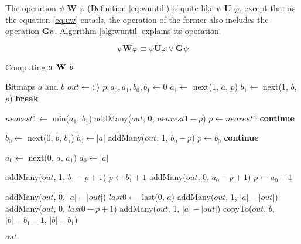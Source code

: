 The operation $\psi \textbf{ W } \varphi$ (Definition \eqref{eq:wuntil}) is quite like $\psi \textbf{ U } \varphi$, except that as the equation \eqref{eq:uw} \citep{huth2004} entails, the operation of the former also includes the operation $\textbf{G}\psi$. Algorithm \ref{alg:wuntil} explains its operation.

\begin{equation} \label{eq:uw}
\psi \textbf{W} \varphi \equiv \psi \textbf{U} \varphi \vee \textbf{G}\psi
\end{equation}

\begin{algorithm}
\caption{Computing $a \mathrel{\mbox{\,\textbf{W}}}\, b$}
\label{alg:wuntil}
\begin{multicols}{2}
\begin{algorithmic}[1]
\Require Bitmaps $a$ and $b$
\State $out \gets \langle~\rangle$
\State $p, a_0, a_1, b_0, b_1 \gets 0$
    \State $a_1 \gets$ next(1, $a$, $p$)
  \EndIf
    \State $b_1 \gets$ next(1, $b$, $p$)
  \EndIf
    \State \textbf{break}
  \EndIf

  \State $nearest1 \gets$ min($a_1$, $b_1$)
    \State addMany($out$, 0, $nearest1 - p$)
    \State $p \gets nearest1$
    \State \textbf{continue}
  \EndIf

      \State $b_0 \gets$ next(0, $b$, $b_1$)
        \State $b_0 \gets |a|$
      \EndIf
    \EndIf
    \State addMany($out$, 1, $b_0 - p$)
    \State $p \gets b_0$
    \State \textbf{continue}
  \EndIf

    \State  $a_0 \gets$ next(0, $a$, $a_1$)
      \State $a_0 \gets |a|$
    \EndIf
  \EndIf

    \State addMany($out$, 1, $b_1 - p + 1$)
    \State $p \gets b_1 + 1$
  \Else
    \State addMany($out$, 0, $a_0 - p + 1$)
    \State $p \gets a_0 + 1$
  \EndIf
\EndWhile

    \State addMany($out$, 0, $|a| - |out|$)
  \Else
    \State $last0 \gets$ last(0, $a$)
      \State addMany($out$, 1, $|a| - |out|$)
    \Else
      \State addMany($out$, 0, $last0 - p + 1$)
      \State addMany($out$, 1, $|a| - |out|$)
    \EndIf
  \EndIf
{}
  \State copyTo($out$, $b$, $|b| - b_1 - 1$, $|b| - b_1$)
\EndIf

\State \Return $out$
\end{algorithmic}
\end{multicols}
\end{algorithm}

